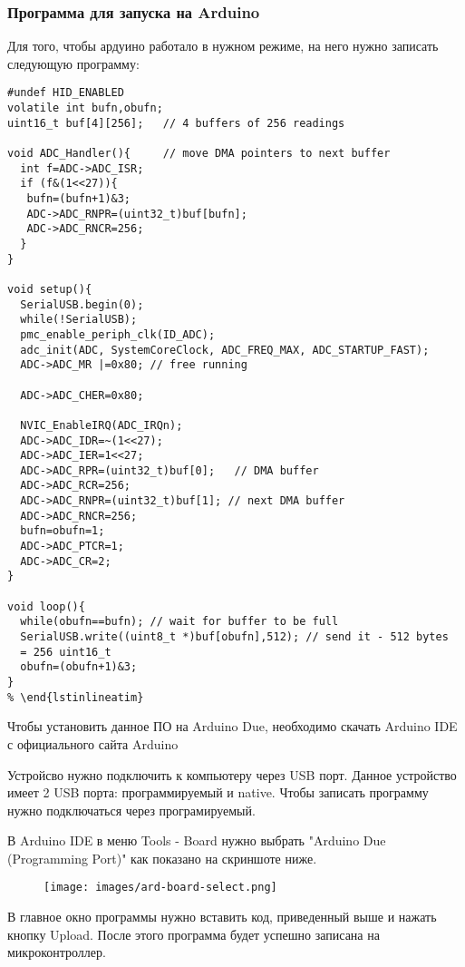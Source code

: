 \documentclass[../main.tex]{subfiles}
\begin{document}
\subsubsection{Программа для запуска на Arduino}
Для того, чтобы ардуино работало в нужном режиме, на него нужно записать следующую программу:
\begin{lstlisting}
#undef HID_ENABLED
volatile int bufn,obufn;
uint16_t buf[4][256];   // 4 buffers of 256 readings

void ADC_Handler(){     // move DMA pointers to next buffer
  int f=ADC->ADC_ISR;
  if (f&(1<<27)){
   bufn=(bufn+1)&3;
   ADC->ADC_RNPR=(uint32_t)buf[bufn];
   ADC->ADC_RNCR=256;
  } 
}

void setup(){
  SerialUSB.begin(0);
  while(!SerialUSB);
  pmc_enable_periph_clk(ID_ADC);
  adc_init(ADC, SystemCoreClock, ADC_FREQ_MAX, ADC_STARTUP_FAST);
  ADC->ADC_MR |=0x80; // free running

  ADC->ADC_CHER=0x80; 

  NVIC_EnableIRQ(ADC_IRQn);
  ADC->ADC_IDR=~(1<<27);
  ADC->ADC_IER=1<<27;
  ADC->ADC_RPR=(uint32_t)buf[0];   // DMA buffer
  ADC->ADC_RCR=256;
  ADC->ADC_RNPR=(uint32_t)buf[1]; // next DMA buffer
  ADC->ADC_RNCR=256;
  bufn=obufn=1;
  ADC->ADC_PTCR=1;
  ADC->ADC_CR=2;
}

void loop(){
  while(obufn==bufn); // wait for buffer to be full
  SerialUSB.write((uint8_t *)buf[obufn],512); // send it - 512 bytes
  = 256 uint16_t
  obufn=(obufn+1)&3;    
}
% \end{lstinlineatim}
\end{lstlisting}




Чтобы установить данное ПО на Arduino Due, необходимо скачать Arduino IDE с официального сайта Arduino\cite{arduino-ide}

Устройсво нужно подключить к компьютеру через USB порт. Данное устройство имеет 2 USB порта: программируемый и native. Чтобы записать программу нужно подключаться через програмируемый.

В Arduino IDE в меню Tools - Board нужно выбрать "Arduino Due (Programming Port)" как показано на скриншоте ниже.
\begin{figure}[H]
\centering
\texttt{[image: images/ard-board-select.png]}
\end{figure}

В главное окно программы нужно вставить код, приведенный выше и нажать кнопку Upload. После этого программа будет успешно записана на микроконтроллер.
\end{document}
